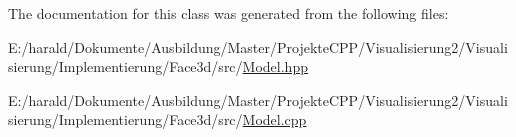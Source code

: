 The documentation for this class was generated from the following files\+:\begin{DoxyCompactItemize}
\item 
E\+:/harald/\+Dokumente/\+Ausbildung/\+Master/\+Projekte\+C\+P\+P/\+Visualisierung2/\+Visualisierung/\+Implementierung/\+Face3d/src/\hyperlink{_model_8hpp}{Model.\+hpp}\item 
E\+:/harald/\+Dokumente/\+Ausbildung/\+Master/\+Projekte\+C\+P\+P/\+Visualisierung2/\+Visualisierung/\+Implementierung/\+Face3d/src/\hyperlink{_model_8cpp}{Model.\+cpp}\end{DoxyCompactItemize}
